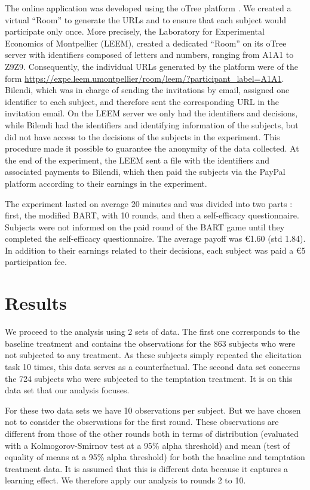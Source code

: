 \documentclass[
]{book}
\begin{document}
The online application was developed using the oTree platform \citet{chen2016}.
We created a virtual ``Room'' to generate the URLs and to ensure that each subject would participate only once.
More precisely, the Laboratory for Experimental Economics of Montpellier (LEEM), created a dedicated ``Room'' on its oTree server with identifiers composed of letters and numbers, ranging from A1A1 to Z9Z9.
Consequently, the individual URLs generated by the platform were of the form \url{https://expe.leem.umontpellier/room/leem/?participant_label=A1A1}.
Bilendi, which was in charge of sending the invitations by email, assigned one identifier to each subject, and therefore sent the corresponding URL in the invitation email.
On the LEEM server we only had the identifiers and decisions, while Bilendi had the identifiers and identifying information of the subjects, but did not have access to the decisions of the subjects in the experiment.
This procedure made it possible to guarantee the anonymity of the data collected.
At the end of the experiment, the LEEM sent a file with the identifiers and associated payments to Bilendi, which then paid the subjects via the PayPal platform according to their earnings in the experiment.

The experiment lasted on average 20 minutes and was divided into two parts :
first, the modified BART, with 10 rounds, and then a self-efficacy questionnaire.
Subjects were not informed on the paid round of the BART game until they completed the self-efficacy questionnaire.
The average payoff was €1.60 (std 1.84).
In addition to their earnings related to their decisions, each subject was paid a €5 participation fee.

\hypertarget{result2}{%
\section{Results}\label{result2}}

We proceed to the analysis using 2 sets of data.
The first one corresponds to the baseline treatment and contains the
observations for the 863 subjects who were not subjected to any treatment.
As these subjects simply repeated the elicitation task 10 times, this data
serves as a counterfactual.
The second data set concerns the 724 subjects who were subjected to the temptation treatment.
It is on this data set that our analysis focuses.

For these two data sets we have 10 observations per subject.
But we have chosen not to consider the observations for the first round.
These observations are different from those of the other rounds both in terms of
distribution (evaluated with a Kolmogorov-Smirnov test at a 95\% alpha threshold)
and mean (test of equality of means at a 95\% alpha threshold) for both the
baseline and temptation treatment data.
It is assumed that this is different data because it captures a learning effect.
We therefore apply our analysis to rounds 2 to 10.
\end{document}
